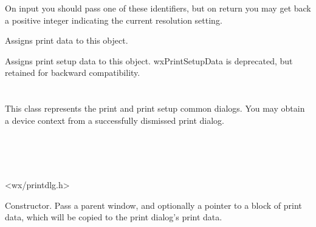 On input you should pass one of these identifiers, but on return you may get back a positive integer
indicating the current resolution setting.

\label{wxprintdataassign}


Assigns print data to this object.


Assigns print setup data to this object. wxPrintSetupData is deprecated,
but retained for backward compatibility.

\section{}\label{wxprintdialog}

This class represents the print and print setup common dialogs.
You may obtain a  device context from
a successfully dismissed print dialog.


\\
\\
\\


<wx/printdlg.h>






Constructor. Pass a parent window, and optionally a pointer to a block of print
data, which will be copied to the print dialog's print data.






